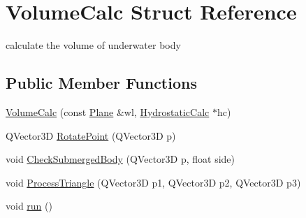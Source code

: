 \hypertarget{structVolumeCalc}{}\section{Volume\+Calc Struct Reference}
\label{structVolumeCalc}


calculate the volume of underwater body  


\subsection*{Public Member Functions}
\begin{DoxyCompactItemize}
\item 
\hyperlink{structVolumeCalc_a21a672444dafcae8293fe2b8be4dc071}{Volume\+Calc} (const \hyperlink{classShipCAD_1_1Plane}{Plane} \&wl, \hyperlink{classShipCAD_1_1HydrostaticCalc}{Hydrostatic\+Calc} $\ast$hc)
\item 
Q\+Vector3D \hyperlink{structVolumeCalc_ac075a2bc2a2a39a3e89c8b3184bea996}{Rotate\+Point} (Q\+Vector3D p)
\item 
void \hyperlink{structVolumeCalc_a76b82a9e1e96365185536a8fc799e235}{Check\+Submerged\+Body} (Q\+Vector3D p, float side)
\item 
void \hyperlink{structVolumeCalc_ae4d9b88d4538df112bdf297a3c6364b8}{Process\+Triangle} (Q\+Vector3D p1, Q\+Vector3D p2, Q\+Vector3D p3)
\item 
void \hyperlink{structVolumeCalc_a9dc91b671e810b1bd4236565a89caf05}{run} ()
\end{DoxyCompactItemize}
